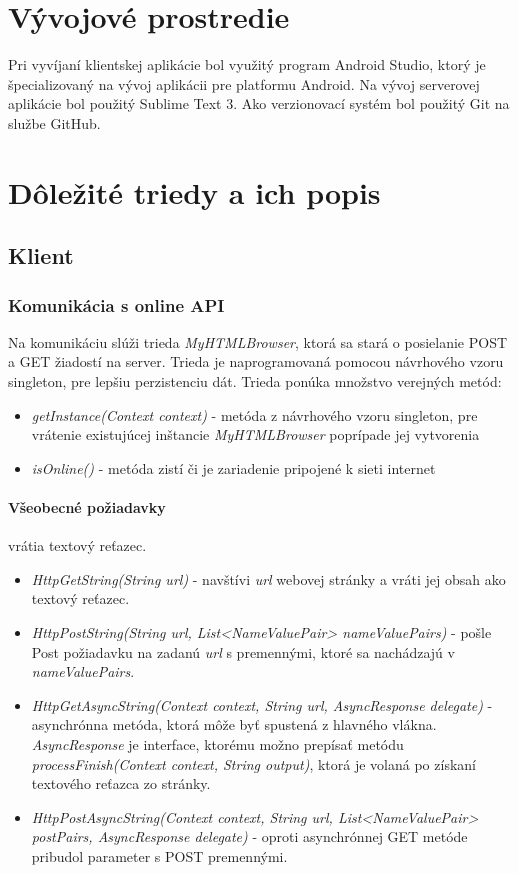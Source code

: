 \section{Vývojové prostredie}
Pri vyvíjaní klientskej aplikácie bol využitý program Android Studio, ktorý je špecializovaný na vývoj aplikácii pre platformu Android. Na vývoj serverovej aplikácie bol použitý Sublime Text 3. Ako verzionovací systém bol použitý Git na službe GitHub.

\section{Dôležité triedy a ich popis}
\subsection{Klient}
\subsubsection{Komunikácia s online API}
Na komunikáciu slúži trieda \emph{MyHTMLBrowser}, ktorá sa stará o posielanie POST a GET žiadostí na server. Trieda je naprogramovaná pomocou návrhového vzoru singleton, pre lepšiu perzistenciu dát. Trieda ponúka množstvo verejných metód:
\begin{itemize}
  \item \emph{getInstance(Context context)} - metóda z návrhového vzoru singleton, pre vrátenie existujúcej inštancie \emph{MyHTMLBrowser} poprípade jej vytvorenia
  \item \emph{isOnline()} - metóda zistí či je zariadenie pripojené k sieti internet 
\end{itemize}

\paragraph*{Všeobecné požiadavky} vrátia textový reťazec. 
\begin{itemize}
  \item \emph{HttpGetString(String url)} - navštívi \emph{url} webovej stránky a vráti jej obsah ako textový reťazec.
  \item \emph{HttpPostString(String url, List<NameValuePair> nameValuePairs)} - pošle Post požiadavku na zadanú \emph{url} s premennými, ktoré sa nachádzajú v \emph{nameValuePairs}. 
  \item \emph{HttpGetAsyncString(Context context, String url, AsyncResponse delegate)} - asynchrónna metóda, ktorá môže byť spustená z hlavného vlákna. \emph{AsyncResponse} je interface, ktorému možno prepísať metódu \emph{processFinish(Context context, String output)}, ktorá je volaná po získaní textového reťazca zo stránky.  
  \item \emph{HttpPostAsyncString(Context context, String url, List<NameValuePair> postPairs, AsyncResponse delegate)} - oproti asynchrónnej GET metóde pribudol parameter s POST premennými. 
\end{itemize}



